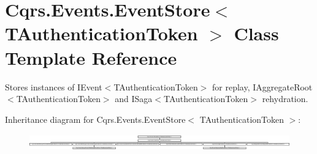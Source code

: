 \hypertarget{classCqrs_1_1Events_1_1EventStore}{}\section{Cqrs.\+Events.\+Event\+Store$<$ T\+Authentication\+Token $>$ Class Template Reference}
\label{classCqrs_1_1Events_1_1EventStore}


Stores instances of I\+Event$<$\+T\+Authentication\+Token$>$ for replay, I\+Aggregate\+Root$<$\+T\+Authentication\+Token$>$ and I\+Saga$<$\+T\+Authentication\+Token$>$ rehydration.  


Inheritance diagram for Cqrs.\+Events.\+Event\+Store$<$ T\+Authentication\+Token $>$\+:\begin{figure}[H]
\begin{center}
\leavevmode
\includegraphics[height=0.719332cm]{classCqrs_1_1Events_1_1EventStore}
\end{center}
\end{figure}
